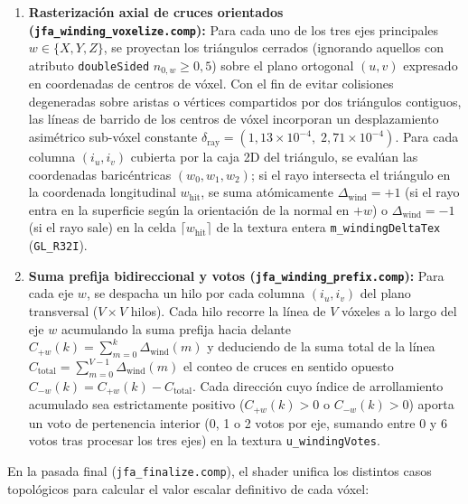 \begin{enumerate}
  \item \textbf{Rasterización axial de cruces orientados (\texttt{jfa\_winding\_voxelize.comp}):} Para cada uno de los tres ejes principales $w \in \{X, Y, Z\}$, se proyectan los triángulos cerrados (ignorando aquellos con atributo \texttt{doubleSided} $n_{0,w} \ge 0,5$) sobre el plano ortogonal $(u, v)$ expresado en coordenadas de centros de vóxel. Con el fin de evitar colisiones degeneradas sobre aristas o vértices compartidos por dos triángulos contiguos, las líneas de barrido de los centros de vóxel incorporan un desplazamiento asimétrico sub-vóxel constante $\delta_{\text{ray}} = (1,13\times 10^{-4},\; 2,71\times 10^{-4})$. Para cada columna $(i_u, i_v)$ cubierta por la caja 2D del triángulo, se evalúan las coordenadas baricéntricas $(w_0, w_1, w_2)$; si el rayo intersecta el triángulo en la coordenada longitudinal $w_{\text{hit}}$, se suma atómicamente $\Delta_{\text{wind}} = +1$ (si el rayo entra en la superficie según la orientación de la normal en $+w$) o $\Delta_{\text{wind}} = -1$ (si el rayo sale) en la celda $\lceil w_{\text{hit}} \rceil$ de la textura entera \texttt{m\_windingDeltaTex} (\texttt{GL\_R32I}).
  \item \textbf{Suma prefija bidireccional y votos (\texttt{jfa\_winding\_prefix.comp}):} Para cada eje $w$, se despacha un hilo por cada columna $(i_u, i_v)$ del plano transversal ($V \times V$ hilos). Cada hilo recorre la línea de $V$ vóxeles a lo largo del eje $w$ acumulando la suma prefija hacia delante $C_{+w}(k) = \sum_{m=0}^{k} \Delta_{\text{wind}}(m)$ y deduciendo de la suma total de la línea $C_{\text{total}} = \sum_{m=0}^{V-1} \Delta_{\text{wind}}(m)$ el conteo de cruces en sentido opuesto $C_{-w}(k) = C_{+w}(k) - C_{\text{total}}$. Cada dirección cuyo índice de arrollamiento acumulado sea estrictamente positivo ($C_{+w}(k) > 0$ o $C_{-w}(k) > 0$) aporta un voto de pertenencia interior (0, 1 o 2 votos por eje, sumando entre 0 y 6 votos tras procesar los tres ejes) en la textura \texttt{u\_windingVotes}.
\end{enumerate}

En la pasada final (\texttt{jfa\_finalize.comp}), el shader unifica los distintos casos topológicos para calcular el valor escalar definitivo de cada vóxel:

